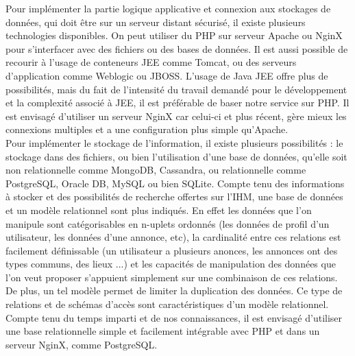 \documentclass[a4paper,11pt]{article}
\begin{document}
Pour implémenter la partie logique applicative et connexion aux stockages de données, qui doit être
sur un serveur distant sécurisé, il existe plusieurs technologies disponibles. On peut utiliser du PHP sur
serveur Apache ou NginX pour s’interfacer avec des fichiers ou des bases de données. Il est aussi possible de
recourir à l’usage de conteneurs JEE comme Tomcat, ou des serveurs d’application comme Weblogic
ou JBOSS. L’usage de Java JEE offre plus de possibilités, mais du fait de l’intensité du travail demandé
pour le développement et la complexité associé à JEE, il est préférable de baser notre service sur PHP.
Il est envisagé d'utiliser un serveur NginX car celui-ci et plus récent, gère mieux les connexions
multiples et a une configuration plus simple qu'Apache.\\

Pour implémenter le stockage de l’information, il existe plusieurs possibilités : le stockage dans des
fichiers, ou bien l’utilisation d'une base de données, qu’elle soit non relationnelle comme MongoDB,
Cassandra, ou relationnelle comme PostgreSQL, Oracle DB, MySQL ou bien SQLite. Compte tenu des
informations à stocker et des possibilités de recherche offertes sur l’IHM, une base de données et un
modèle relationnel sont plus indiqués. En effet les données que l'on manipule sont catégorisables
en n-uplets ordonnés (les données de profil d'un utilisateur, les données d'une annonce, etc), la
cardinalité entre ces relations est facilement définissable (un utilisateur a plusieurs anonces, les
annonces ont des types communs, des lieux ...) et les capacités de manipulation des données que l'on
veut proposer s'appuient simplement sur une combinaison de ces relations. De plus, un tel modèle permet de
limiter la duplication des données. Ce type de relations et de schémas d'accès sont caractéristiques
d'un modèle relationnel. Compte tenu du temps imparti et de nos connaissances,
il est envisagé d’utiliser une base relationnelle simple et facilement intégrable avec PHP et
dans un serveur NginX, comme PostgreSQL.\\
\pagebreak
\end{document}
